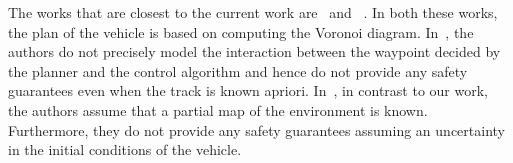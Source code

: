 The works that are closest to the current work are~\cite{Das.2011} and ~\cite{Dolgov.2010}. In both these works, the plan of the vehicle is based on computing the Voronoi diagram. In~\cite{Das.2011}, the authors do not precisely model the interaction between the waypoint decided by the planner and the control algorithm and hence do not provide any safety guarantees even when the track is known apriori. In~\cite{Dolgov.2010}, in contrast to our work, the authors assume that a partial map of the environment is known. Furthermore, they do not provide any safety guarantees assuming an uncertainty in the initial conditions of the vehicle.
